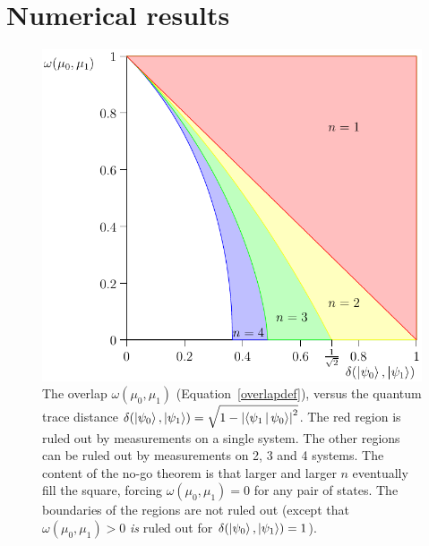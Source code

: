 \documentclass[amsmath,amssymb,superscriptaddress,twocolumn,pra]{revtex4-1}
\newcommand{\abs}[1]{\left\lvert{#1}\right\rvert}
\begin{document}
\section{Numerical results}

\begin{figure}
  \begin{center}
\includegraphics[scale=0.7]{figs/regions}
  \end{center}
\caption{The overlap $\omega(\mu_0,\mu_1)$ (Equation~\eqref{overlapdef}), versus the quantum trace distance $\delta(\ket{\psi_0}, \ket{\psi_1}) = \sqrt{1 - \abs{\Braket{\psi_1|\psi_0}}^2}$. The red region is ruled out by measurements on a single system. The other regions can be ruled out by measurements on 2, 3 and 4 systems. The content of the no-go theorem is that larger and larger $n$ eventually fill the square, forcing $\omega(\mu_0, \mu_1) = 0$ for any pair of states. The boundaries of the regions are not ruled out (except that $\omega(\mu_0, \mu_1)>0$ \emph{is} ruled out for $\delta(\ket{\psi_0}, \ket{\psi_1}) = 1$).}
  \label{regions}
\end{figure}
\end{document}
